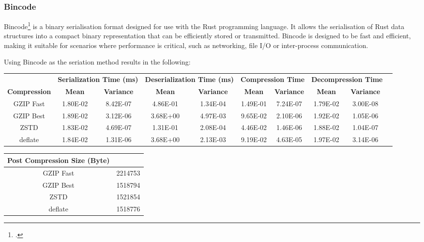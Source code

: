 \subsubsection{Bincode}
Bincode\footcite{bincode} is a binary serialisation format designed for use with the Rust programming language. It allows the serialisation of Rust data structures into a compact binary representation that can be efficiently stored or transmitted. Bincode is designed to be fast and efficient, making it suitable for scenarios where performance is critical, such as networking, file I/O or inter-process communication.

Using Bincode as the seriation method results in the following:

\begin{table}[H]
\scriptsize
\centering
\begin{tabular}{cccccccccc}
\hline
 &
  \multicolumn{2}{c}{\textbf{Serialization Time (ms)}} &
  \multicolumn{2}{c}{\textbf{Deserialization Time (ms)}} &
  \multicolumn{2}{c}{\textbf{Compression Time}} &
  \multicolumn{2}{c}{\textbf{Decompression Time}} &
   \\
\textbf{Compression} & \textbf{Mean}     & \textbf{Variance} & \textbf{Mean}     & \textbf{Variance} & \textbf{Mean}     & \textbf{Variance} & \textbf{Mean}     & \textbf{Variance} \\
\hline
GZIP Fast           & 1.80E-02 & 8.42E-07 & 4.86E-01 & 1.34E-04 & 1.49E-01 & 7.24E-07 & 1.79E-02 & 3.00E-08  \\
GZIP Best           & 1.89E-02 & 3.12E-06 & 3.68E+00 & 4.97E-03 & 9.65E-02 & 2.10E-06 & 1.92E-02 & 1.05E-06  \\
ZSTD                & 1.83E-02 & 4.69E-07 & 1.31E-01 & 2.08E-04 & 4.46E-02 & 1.46E-06 & 1.88E-02 & 1.04E-07  \\
deflate             & 1.84E-02 & 1.31E-06 & 3.68E+00 & 2.13E-03 & 9.19E-02 & 4.63E-05 & 1.97E-02 & 3.14E-06  \\
\hline
\end{tabular}
\end{table}

\begin{table}[H]
  \scriptsize
  \centering
  \begin{tabular}{cc}
  \hline
  \textbf{Post Compression Size (Byte)} \\
  \hline
  GZIP Fast           & 2214753 \\
  GZIP Best           & 1518794 \\
  ZSTD                & 1521854 \\
  deflate             & 1518776 \\
  \hline
  \end{tabular}
  \end{table}

